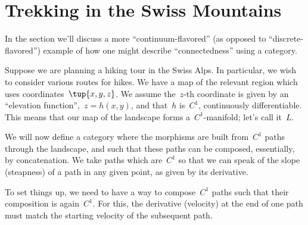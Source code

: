 \section{Trekking in the Swiss Mountains }
\label{sec:trekking}



In the section we'll discuss a more ``continuum-flavored'' (as opposed to ``discrete-flavored'') example of how one might describe ``connectedness'' using a category.


Suppose we are planning a hiking tour in the Swiss Alps. In particular, we wish to consider various routes for hikes. We have a map of the relevant region which uses coordinates~$\tup{x,y,z}$. We assume the~$z$-th coordinate is given by an ``elevation function'',~$z = h(x,y)$, and that~$h$ is~$C^1$,  continuously differentiable. This means that our map of the landscape forms a~$C^1$-manifold; let's call it~$L$.


We will now define a category where the morphisms are built from~$C^1$ paths through the landscape, and such that these paths can be composed, essentially, by concatenation. We take paths which are~$C^1$ so that we can speak of the slope (steapness) of a path in any given point, as given by its derivative.

%
%


To set things up, we need to have a way to compose~$C^1$ paths such that their composition is again~$C^1$. For this, the derivative (velocity) at the end of one path must match the starting velocity of the subsequent path.

